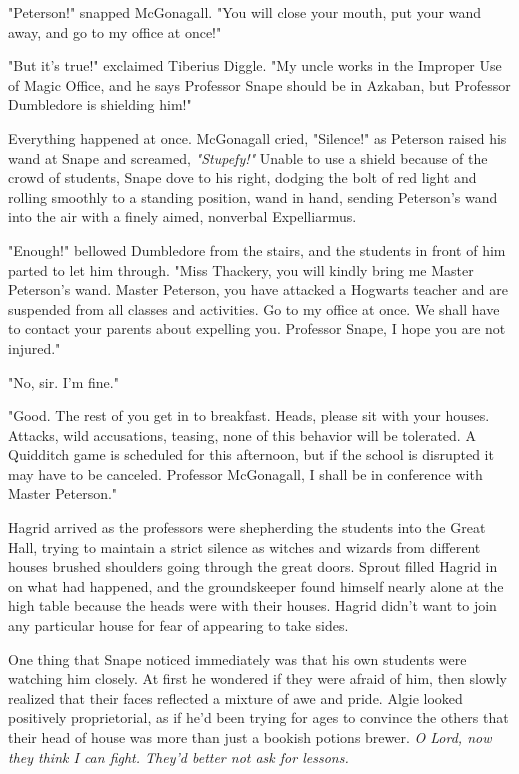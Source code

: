 "Peterson!" snapped McGonagall. "You will close your mouth, put your wand away, and go to my office at once!"

"But it's true!" exclaimed Tiberius Diggle. "My uncle works in the Improper Use of Magic Office, and he says Professor Snape should be in Azkaban, but Professor Dumbledore is shielding him!"

Everything happened at once. McGonagall cried, "Silence!" as Peterson raised his wand at Snape and screamed, \emph{"Stupefy!"} Unable to use a shield because of the crowd of students, Snape dove to his right, dodging the bolt of red light and rolling smoothly to a standing position, wand in hand, sending Peterson's wand into the air with a finely aimed, nonverbal Expelliarmus.

"Enough!" bellowed Dumbledore from the stairs, and the students in front of him parted to let him through. "Miss Thackery, you will kindly bring me Master Peterson's wand. Master Peterson, you have attacked a Hogwarts teacher and are suspended from all classes and activities. Go to my office at once. We shall have to contact your parents about expelling you. Professor Snape, I hope you are not injured."

"No, sir. I'm fine."

"Good. The rest of you get in to breakfast. Heads, please sit with your houses. Attacks, wild accusations, teasing, none of this behavior will be tolerated. A Quidditch game is scheduled for this afternoon, but if the school is disrupted it may have to be canceled. Professor McGonagall, I shall be in conference with Master Peterson."

Hagrid arrived as the professors were shepherding the students into the Great Hall, trying to maintain a strict silence as witches and wizards from different houses brushed shoulders going through the great doors. Sprout filled Hagrid in on what had happened, and the groundskeeper found himself nearly alone at the high table because the heads were with their houses. Hagrid didn't want to join any particular house for fear of appearing to take sides.

One thing that Snape noticed immediately was that his own students were watching him closely. At first he wondered if they were afraid of him, then slowly realized that their faces reflected a mixture of awe and pride. Algie looked positively proprietorial, as if he'd been trying for ages to convince the others that their head of house was more than just a bookish potions brewer. \emph{O Lord, now they think I can fight. They'd better not ask for lessons.}

